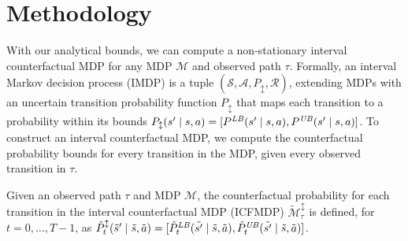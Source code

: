 

\section{Methodology}
With our analytical bounds, we can compute a non-stationary interval counterfactual MDP for any MDP $\mathcal{M}$ and observed path $\tau$. Formally, an interval Markov decision process (IMDP) \citep{GIVAN200071} is a tuple $(\mathcal{S}, \mathcal{A}, P_{\updownarrow}, \mathcal{R})$, extending MDPs with an uncertain transition probability function $P_{\updownarrow}$ that maps each transition to a probability within its bounds $P_{\updownarrow}(s' \mid s, a) = [P^{\it LB}(s' \mid s, a), P^{\it UB}(s' \mid s, a)]$. To construct an interval counterfactual MDP, we compute the counterfactual probability bounds for every transition in the MDP, given every observed transition in $\tau$.
\begin{definition}
Given an observed path $\tau$ and MDP $\mathcal{M}$, the counterfactual probability for each transition in the interval counterfactual MDP (ICFMDP) ${\tilde{\mathcal{M}}^{\updownarrow}_{\tau}}$ is defined, for $t=0,\ldots,T-1$, as $\tilde{P}^{\updownarrow}_{t}(\tilde{s}' \mid \tilde{s}, \tilde{a}) = [\tilde{P}_{t}^{\it LB}(\tilde{s'} \mid \tilde{s}, \tilde{a}), \tilde{P}_{t}^{\it UB}(\tilde{s'} \mid \tilde{s}, \tilde{a})]$.
%
%
%
%
%
%
\end{definition}
%
%
%

%
%
%
%

